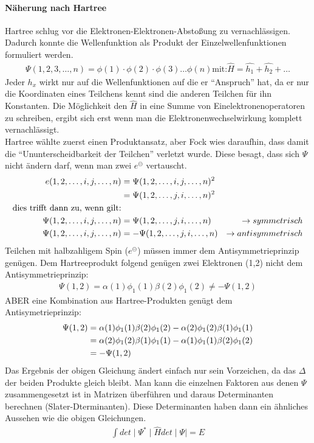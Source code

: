 \documentclass[12pt,a4paper,oneside,normalheadings,abstracton,liststotoc,bibtotoc,titlepage,pdftex]{scrartcl}
\begin{document}
\paragraph{Näherung nach Hartree}
Hartree schlug vor die Elektronen-Elektronen-Abstoßung zu vernachlässigen. Dadurch konnte die Wellenfunktion als Produkt der Einzelwellenfunktionen formuliert werden.
\begin{align}
\Psi(1,2,3,\dots,n) = \phi(1) \cdot \phi(2) \cdot \phi(3) \dots \phi(n) \text{mit:} \widehat{H}=\widehat{h_1}+\widehat{h_2}+\dots
\end{align}
Jeder $h_x$ wirkt nur auf die Wellenfunktionen auf die er ``Anspruch'' hat, da er nur die Koordinaten eines Teilchens kennt sind die anderen Teilchen für ihn Konstanten. Die Möglichkeit den $\widehat{H}$ in eine Summe von Einelektronenoperatoren zu schreiben, ergibt sich erst wenn man die Elektronenwechselwirkung komplett vernachlässigt.\\
Hartree wählte zuerst einen Produktansatz, aber Fock wies daraufhin, dass damit die ``Ununterscheidbarkeit der Teilchen'' verletzt wurde. Diese besagt, dass sich $\Psi$ nicht ändern darf, wenn man zwei ${e^\circleddash}$ vertauscht.
\begin{align}
e(1,2,\dots,i,j,\dots,n)&=\Psi(1,2,\dots,i,j,\dots,n)^2\\
\notag &=\Psi(1,2,\dots,j,i,\dots,n)^2\\
\notag \text{dies trifft dann zu, wenn gilt:}\\
\Psi(1,2,\dots,i,j,\dots,n)&=\Psi(1,2,\dots,j,i,\dots,n) & \rightarrow symmetrisch\\
\Psi(1,2,\dots,i,j,\dots,n)&=-\Psi(1,2,\dots,j,i,\dots,n) & \rightarrow antisymmetrisch
\end{align}
Teilchen mit halbzahligem Spin (${e^\circleddash}$) müssen immer dem Antisymmetrieprinzip genügen. Dem Hartreeprodukt folgend genügen zwei Elektronen (1,2) nicht dem Antisymmetrieprinzip:
\begin{align}
\Psi(1,2)=\alpha(1)\phi_1(1)\beta(2)\phi_1(2)\neq-\Psi(1,2)
\end{align}
ABER eine Kombination aus Hartree-Produkten genügt dem Antisymetrieprinzip:
\begin{align}
\Psi(1,2)&=\alpha(1)\phi_1(1)\beta(2)\phi_1(2)-\alpha(2)\phi_1(2)\beta(1)\phi_1(1)\\
\notag &=\alpha(2)\phi_1(2)\beta(1)\phi_1(1)-\alpha(1)\phi_1(1)\beta(2)\phi_1(2)\\
\notag &=-\Psi(1,2)
\end{align}
Das Ergebnis der obigen Gleichung ändert einfach nur sein Vorzeichen, da das $\Delta$ der beiden Produkte gleich bleibt. Man kann die einzelnen Faktoren aus denen $\Psi$ zusammengesetzt ist in Matrizen überführen und daraus Determinanten berechnen (Slater-Dterminanten). Diese Determinanten haben dann ein ähnliches Aussehen wie die obigen Gleichungen.
\begin{align}
\int det \mid \Psi^*\mid \widehat{H} det \mid \Psi\mid = E
\end{align}
\end{document}
